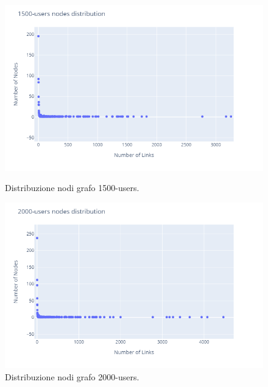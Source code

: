     \begin{figure}[!htbp]
        \centering
        \begin{minipage}[b]{0.49\textwidth}
            \includegraphics[width=\textwidth]{resources/charts/1500_users_nodes.png}
            \caption{Distribuzione nodi grafo 1500-users.}
        \end{minipage}
        \hfill
        \begin{minipage}[b]{0.49\textwidth}
            \includegraphics[width=\textwidth]{resources/charts/2000_users_nodes.png}
            \caption{Distribuzione nodi grafo 2000-users.}
        \end{minipage}
    \end{figure}
    
